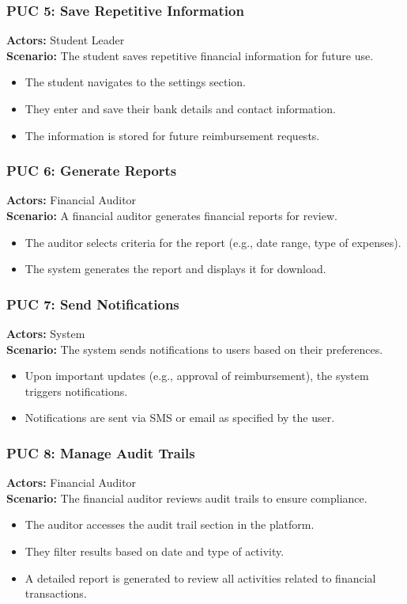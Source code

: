 \documentclass[12pt]{article}
\begin{document}
\subsubsection{PUC 5: Save Repetitive Information}
\textbf{Actors:} Student Leader \\
\textbf{Scenario:} The student saves repetitive financial information for future use.
\begin{itemize}
    \item The student navigates to the settings section.
    \item They enter and save their bank details and contact information.
    \item The information is stored for future reimbursement requests.
\end{itemize}

\subsubsection{PUC 6: Generate Reports}
\textbf{Actors:} Financial Auditor \\
\textbf{Scenario:} A financial auditor generates financial reports for review.
\begin{itemize}
    \item The auditor selects criteria for the report (e.g., date range, type of expenses).
    \item The system generates the report and displays it for download.
\end{itemize}

\subsubsection{PUC 7: Send Notifications}
\textbf{Actors:} System \\
\textbf{Scenario:} The system sends notifications to users based on their preferences.
\begin{itemize}
    \item Upon important updates (e.g., approval of reimbursement), the system triggers notifications.
    \item Notifications are sent via SMS or email as specified by the user.
\end{itemize}

\subsubsection{PUC 8: Manage Audit Trails}
\textbf{Actors:} Financial Auditor \\
\textbf{Scenario:} The financial auditor reviews audit trails to ensure compliance.
\begin{itemize}
    \item The auditor accesses the audit trail section in the platform.
    \item They filter results based on date and type of activity.
    \item A detailed report is generated to review all activities related to financial transactions.
\end{itemize}
\end{document}
